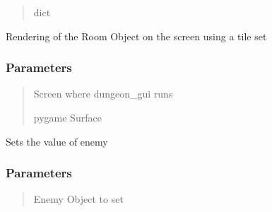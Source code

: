 \documentclass[letterpaper,10pt,english]{sphinxmanual}
\begin{document}
\begin{fulllineitems}
\begin{fulllineitems}
\begin{quote}
\begin{description}
\sphinxAtStartPar
dict

\end{description}\end{quote}

\end{fulllineitems}


\begin{fulllineitems}
\label{\detokenize{api_reference/dungeon_gui/Room:Room.Room.render}}
\pysigstartsignatures
{}
\pysigstopsignatures
\sphinxAtStartPar
Rendering of the Room Object on the screen using a tile set


\subsubsection{Parameters}
\label{\detokenize{api_reference/dungeon_gui/Room:parameters}}\begin{quote}\begin{description}
\sphinxAtStartPar
Screen where dungeon\_gui runs

\sphinxAtStartPar
pygame Surface

\end{description}\end{quote}

\end{fulllineitems}


\begin{fulllineitems}
\label{\detokenize{api_reference/dungeon_gui/Room:Room.Room.set_enemy}}
\pysigstartsignatures
{}
\pysigstopsignatures
\sphinxAtStartPar
Sets the value of enemy


\subsubsection{Parameters}
\label{\detokenize{api_reference/dungeon_gui/Room:id1}}\begin{quote}\begin{description}
\sphinxAtStartPar
Enemy Object to set


\end{description}
\end{quote}
\end{fulllineitems}
\end{fulllineitems}
\end{document}
